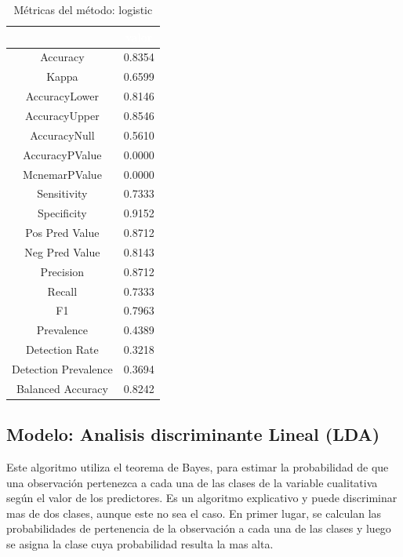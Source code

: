 \begin{table}[!h]
	
	\caption{\label{tab:metricas_logistic}Métricas del método: logistic }
	\centering
	\begin{tabular}[t]{cc}
		\toprule
		\rowcolor{black}  \multicolumn{1}{c}{\textcolor{white}{\textbf{metricas}}} & \multicolumn{1}{c}{\textcolor{white}{\textbf{valor}}}\\
		\midrule
		\rowcolor{gray!6}  Accuracy & 0.8354\\
		Kappa & 0.6599\\
		\rowcolor{gray!6}  AccuracyLower & 0.8146\\
		AccuracyUpper & 0.8546\\
		\rowcolor{gray!6}  AccuracyNull & 0.5610\\
		\addlinespace
		AccuracyPValue & 0.0000\\
		\rowcolor{gray!6}  McnemarPValue & 0.0000\\
		Sensitivity & 0.7333\\
		\rowcolor{gray!6}  Specificity & 0.9152\\
		Pos Pred Value & 0.8712\\
		\addlinespace
		\rowcolor{gray!6}  Neg Pred Value & 0.8143\\
		Precision & 0.8712\\
		\rowcolor{gray!6}  Recall & 0.7333\\
		F1 & 0.7963\\
		\rowcolor{gray!6}  Prevalence & 0.4389\\
		\addlinespace
		Detection Rate & 0.3218\\
		\rowcolor{gray!6}  Detection Prevalence & 0.3694\\
		Balanced Accuracy & 0.8242\\
		\bottomrule
	\end{tabular}
\end{table}




\subsection{Modelo: Analisis discriminante Lineal
	(LDA)}

Este algoritmo utiliza el teorema de Bayes, para estimar la probabilidad
de que una observación pertenezca a cada una de las clases de la
variable cualitativa según el valor de los predictores. Es un algoritmo
explicativo y puede discriminar mas de dos clases, aunque este no sea el
caso. En primer lugar, se calculan las probabilidades de
pertenencia de la observación a cada una de las clases y luego se asigna la clase cuya probabilidad resulta la mas alta.



